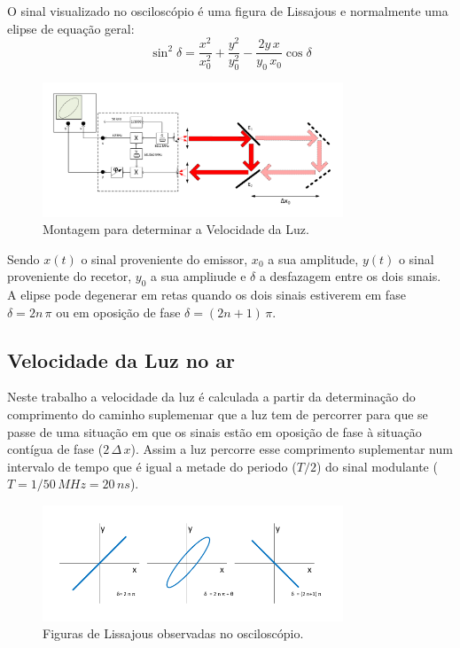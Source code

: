 \documentclass[a4paper,12pt]{article}      %
\begin{document}
O sinal visualizado no osciloscópio é uma figura de Lissajous e normalmente uma elipse de equação geral:
\begin{equation}
	\label{eq:elipse}
	\sin^2 \delta = \frac{x^2}{x_0^2} + \frac{y^2}{y_0^2} - \frac{2y\,x}{y_0\,x_0} \cos  \delta
\end{equation}

\begin{figure}
	[!htb]  \centering 
	\includegraphics[width=0.8\textwidth]{Vel_esquema}
	\caption{Montagem para determinar a Velocidade da Luz. \label{fig:Montagem}} 
\end{figure}

Sendo $x(t)$ o sinal proveniente do emissor,  $x_0$  a sua amplitude,  $y(t)$ o sinal
proveniente do recetor, $y_0$ a sua ampliıude e $\delta$ a desfazagem entre os dois
sınais. A elipse pode degenerar em retas quando os dois sinais estiverem
em fase $\delta = 2n\,\pi$  ou em oposição de fase $\delta = (2n+1)\,\pi$. 

\subsection{\sf Velocidade da Luz no ar}
Neste trabalho a
velocidade da luz é calculada a partir da determinação do comprimento do
caminho suplemenıar que a luz tem de percorrer para que se passe de uma
situação em que os sinais estão em oposição de fase à situação contígua de
fase ($2\,\Delta\,x$). Assim a luz percorre esse comprimento suplementar num intervalo de
tempo que é igual a metade do periodo ($T/2$) do sinal modulante ($T=1/50\,MHz= 20\,ns$). 

\begin{figure}
	[!htb]  \centering 
	\includegraphics[width=0.8\textwidth]{osci_fase}
	\caption{Figuras de Lissajous observadas no osciloscópio. \label{fig:fase}} 
\end{figure}
\end{document}
